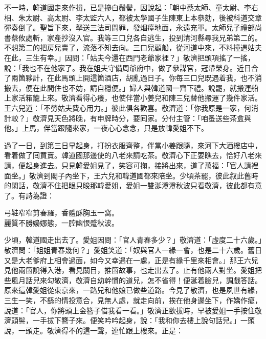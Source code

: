 不一時，韓道國走來作揖，已是摻白鬚鬢，{}因說起：「朝中蔡太師、童太尉、李右相、朱太尉、高太尉、李太監六人，都被太學國子生陳東上本叅劾，後被科道交章彈奏倒了。{}聖旨下來，拏送三法司問罪，發烟瘴地面，永遠充軍。太師兒子禮部尚書蔡攸處斬，家產抄沒入官。我等三口兒各自逃生，投到清河縣尋我兄弟第二的。不想第二的把房兒賣了，流落不知去向。三口兒顧船，從河道中來，不料撞遇姑夫在此，三生有幸。」因問：「姑夫今還在西門老爺家裡？」敬濟把頭項搖了一搖，說：「我也不在他家了。{}我在姐夫守備周爺府中，做了叅謀官，冠帶榮身。近日合了兩箇夥計，在此馬頭上開這箇酒店，胡亂過日子。你每三口兒既遇着我，也不消搬去，便在此間住也不妨，請自穩便。」婦人與韓道國一齊下禮。說罷，就搬運船上家活箱籠上來。敬濟看得心癢，也使伴當小姜兒和陳三兒替他搬運了幾件家活。{}王六兒道：「不勞姑夫費心用力。」彼此俱各歡喜。敬濟道：「你我原是一家，何消計較？」敬濟見天色將晚，有申牌時分，要囘家。分付主管：「咱蚤送些茶盒與他。」上馬，伴當跟隨來家，一夜心心念念，只是放韓愛姐不下。

過了一日，到第三日早起身，打扮衣服齊整，伴當小姜跟隨，來河下大酒樓店中，看着做了囘買賣。韓道國那邊使的八老來請吃茶。敬濟心下正要瞧去，恰好八老來請，便起身進去。只見韓愛姐見了，笑容可掬，{}接將出來，道了萬福：「官人請裡面坐。」敬濟到閣子內坐下，王六兒和韓道國都來陪坐。少頃茶罷，彼此叙此舊時的閑話，敬濟不住把眼只睃那韓愛姐，愛姐一雙涎澄澄秋波只看敬濟，{}彼此都有意了。有詩為證：

\begin{myquote}
弓鞋窄窄剪春羅，香體酥胸玉一窩。\\麗質不勝嬝娜態，一腔幽恨蹙秋波。
\end{myquote}

少頃，韓道國走出去了。愛姐因問：「官人青春多少？」敬濟道：「虛度二十六歲。」敬濟問：「姐姐青春幾何？」愛姐笑道：「奴與官人一緣一會，也是二十六歲。舊日又是大老爹府上相會過面，如今又幸遇在一處，正是有緣千里來相會。」{}那王六兒見他兩箇說得入港，看見關目，推箇故事，也走出去了。{}止有他兩人對坐。愛姐把些風月話兒來勾敬濟，敬濟自幼幹慣的道兒，怎不省得！便涎着臉兒，調戲答話。原來這韓愛姐從東京來，一路兒和他娘已做些道路。{}今見了敬濟，也是夙世有緣，三生一笑，不繇的情投意合，見無人處，就走向前，挨在他身邊坐下，作嬌作癡，說道：「官人，你將頭上金簪子借我看一看。」敬濟正欲拔時，早被愛姐一手按住敬濟頭髻，一手拔下簪子來。{}便笑吟吟起身，說：「我和你去樓上說句話兒。」一頭說，一頭走。敬濟得不的這一聲，連忙跟上樓來。正是：


